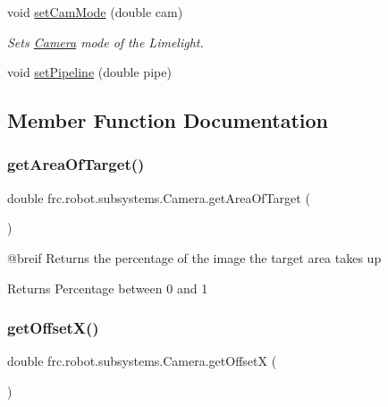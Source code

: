 \begin{DoxyCompactItemize}
\item 
void \mbox{\hyperlink{classfrc_1_1robot_1_1subsystems_1_1_camera_a3139edef938fb996933614b77b07768e}{set\+Cam\+Mode}} (double cam)
\begin{DoxyCompactList}\small\item\em Sets \mbox{\hyperlink{classfrc_1_1robot_1_1subsystems_1_1_camera}{Camera}} mode of the Limelight. \end{DoxyCompactList}\item 
void \mbox{\hyperlink{classfrc_1_1robot_1_1subsystems_1_1_camera_abc908bea32787055889608bbc41d1783}{set\+Pipeline}} (double pipe)
\end{DoxyCompactItemize}


\subsection{Member Function Documentation}
\mbox{\label{classfrc_1_1robot_1_1subsystems_1_1_camera_ab0d35016896e190da03a38c1d8bdaac8}} 
\subsubsection{\texorpdfstring{getAreaOfTarget()}{getAreaOfTarget()}}
{\footnotesize\ttfamily double frc.\+robot.\+subsystems.\+Camera.\+get\+Area\+Of\+Target (\begin{DoxyParamCaption}{ }\end{DoxyParamCaption})\hspace{0.3cm}{\ttfamily [inline]}}

@breif Returns the percentage of the image the target area takes up

\begin{DoxyReturn}{Returns}
Percentage between 0 and 1 
\end{DoxyReturn}
\mbox{\label{classfrc_1_1robot_1_1subsystems_1_1_camera_a09bb1ae0348f9a6bc018ce62169e188f}} 
\subsubsection{\texorpdfstring{getOffsetX()}{getOffsetX()}}
{\footnotesize\ttfamily double frc.\+robot.\+subsystems.\+Camera.\+get\+OffsetX (\begin{DoxyParamCaption}{ }\end{DoxyParamCaption})\hspace{0.3cm}{\ttfamily [inline]}}



